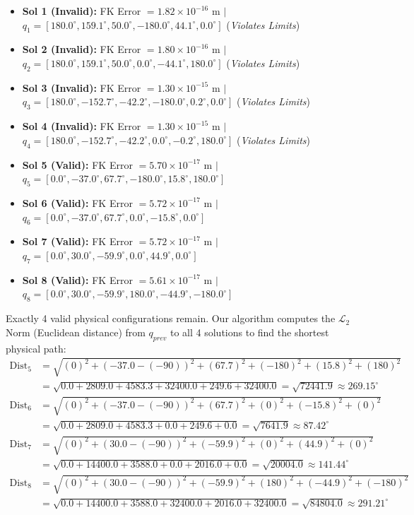 \documentclass[11pt, a4paper]{article}
\begin{document}
\begin{itemize}
    \item \textbf{Sol 1 (Invalid):} FK Error $= 1.82 \times 10^{-16}$ m $|$ $q_1 = [180.0^\circ, 159.1^\circ, 50.0^\circ, -180.0^\circ, 44.1^\circ, 0.0^\circ]$ (\textit{Violates Limits})
    \item \textbf{Sol 2 (Invalid):} FK Error $= 1.80 \times 10^{-16}$ m $|$ $q_2 = [180.0^\circ, 159.1^\circ, 50.0^\circ, 0.0^\circ, -44.1^\circ, 180.0^\circ]$ (\textit{Violates Limits})
    \item \textbf{Sol 3 (Invalid):} FK Error $= 1.30 \times 10^{-15}$ m $|$ $q_3 = [180.0^\circ, -152.7^\circ, -42.2^\circ, -180.0^\circ, 0.2^\circ, 0.0^\circ]$ (\textit{Violates Limits})
    \item \textbf{Sol 4 (Invalid):} FK Error $= 1.30 \times 10^{-15}$ m $|$ $q_4 = [180.0^\circ, -152.7^\circ, -42.2^\circ, 0.0^\circ, -0.2^\circ, 180.0^\circ]$ (\textit{Violates Limits})
    \item \textbf{Sol 5 (Valid):} \phantom{id}FK Error $= 5.70 \times 10^{-17}$ m $|$ $q_5 = [0.0^\circ, -37.0^\circ, 67.7^\circ, -180.0^\circ, 15.8^\circ, 180.0^\circ]$ 
    \item \textbf{Sol 6 (Valid):} \phantom{id}FK Error $= 5.72 \times 10^{-17}$ m $|$ $q_6 = [0.0^\circ, -37.0^\circ, 67.7^\circ, 0.0^\circ, -15.8^\circ, 0.0^\circ]$ 
    \item \textbf{Sol 7 (Valid):} \phantom{id}FK Error $= 5.72 \times 10^{-17}$ m $|$ $q_7 = [0.0^\circ, 30.0^\circ, -59.9^\circ, 0.0^\circ, 44.9^\circ, 0.0^\circ]$ 
    \item \textbf{Sol 8 (Valid):} \phantom{id}FK Error $= 5.61 \times 10^{-17}$ m $|$ $q_8 = [0.0^\circ, 30.0^\circ, -59.9^\circ, 180.0^\circ, -44.9^\circ, -180.0^\circ]$ 
\end{itemize}

Exactly 4 valid physical configurations remain. Our algorithm computes the $\mathcal{L}_2$ Norm (Euclidean distance) from $q_{prev}$ to all 4 solutions to find the shortest physical path:
\begin{align*}
    \text{Dist}_5 &= \sqrt{ (0)^2 + (-37.0 - (-90))^2 + (67.7)^2 + (-180)^2 + (15.8)^2 + (180)^2 } \\
                  &= \sqrt{ 0.0 + 2809.0 + 4583.3 + 32400.0 + 249.6 + 32400.0 } = \sqrt{72441.9} \approx 269.15^\circ \\[10pt]
    \text{Dist}_6 &= \sqrt{ (0)^2 + (-37.0 - (-90))^2 + (67.7)^2 + (0)^2 + (-15.8)^2 + (0)^2 } \\
                  &= \sqrt{ 0.0 + 2809.0 + 4583.3 + 0.0 + 249.6 + 0.0 } = \sqrt{7641.9} \approx 87.42^\circ \\[10pt]
    \text{Dist}_7 &= \sqrt{ (0)^2 + (30.0 - (-90))^2 + (-59.9)^2 + (0)^2 + (44.9)^2 + (0)^2 } \\
                  &= \sqrt{ 0.0 + 14400.0 + 3588.0 + 0.0 + 2016.0 + 0.0 } = \sqrt{20004.0} \approx 141.44^\circ \\[10pt]
    \text{Dist}_8 &= \sqrt{ (0)^2 + (30.0 - (-90))^2 + (-59.9)^2 + (180)^2 + (-44.9)^2 + (-180)^2 } \\
                  &= \sqrt{ 0.0 + 14400.0 + 3588.0 + 32400.0 + 2016.0 + 32400.0 } = \sqrt{84804.0} \approx 291.21^\circ
\end{align*}
\end{document}
